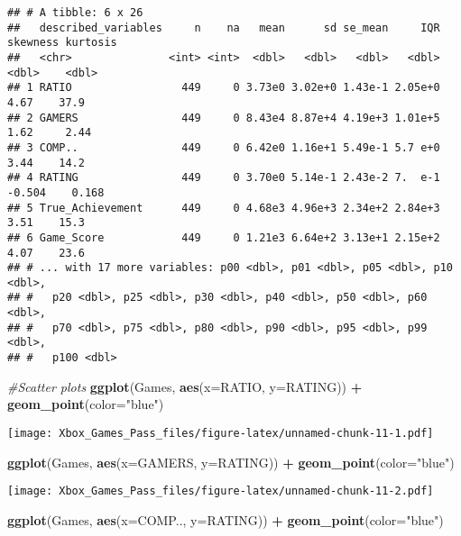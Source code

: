 \documentclass[
]{article}
\newenvironment{Shaded}{\begin{snugshade}}{\end{snugshade}}
\newcommand{\CommentTok}[1]{\textcolor[rgb]{0.56,0.35,0.01}{\textit{#1}}}
\newcommand{\DataTypeTok}[1]{\textcolor[rgb]{0.13,0.29,0.53}{#1}}
\newcommand{\KeywordTok}[1]{\textcolor[rgb]{0.13,0.29,0.53}{\textbf{#1}}}
\newcommand{\NormalTok}[1]{#1}
\newcommand{\OperatorTok}[1]{\textcolor[rgb]{0.81,0.36,0.00}{\textbf{#1}}}
\newcommand{\StringTok}[1]{\textcolor[rgb]{0.31,0.60,0.02}{#1}}
\begin{document}
\begin{verbatim}
## # A tibble: 6 x 26
##   described_variables     n    na   mean      sd se_mean     IQR skewness kurtosis
##   <chr>               <int> <int>  <dbl>   <dbl>   <dbl>   <dbl>    <dbl>    <dbl>
## 1 RATIO                 449     0 3.73e0 3.02e+0 1.43e-1 2.05e+0    4.67    37.9  
## 2 GAMERS                449     0 8.43e4 8.87e+4 4.19e+3 1.01e+5    1.62     2.44 
## 3 COMP..                449     0 6.42e0 1.16e+1 5.49e-1 5.7 e+0    3.44    14.2  
## 4 RATING                449     0 3.70e0 5.14e-1 2.43e-2 7.  e-1   -0.504    0.168
## 5 True_Achievement      449     0 4.68e3 4.96e+3 2.34e+2 2.84e+3    3.51    15.3  
## 6 Game_Score            449     0 1.21e3 6.64e+2 3.13e+1 2.15e+2    4.07    23.6  
## # ... with 17 more variables: p00 <dbl>, p01 <dbl>, p05 <dbl>, p10 <dbl>,
## #   p20 <dbl>, p25 <dbl>, p30 <dbl>, p40 <dbl>, p50 <dbl>, p60 <dbl>,
## #   p70 <dbl>, p75 <dbl>, p80 <dbl>, p90 <dbl>, p95 <dbl>, p99 <dbl>,
## #   p100 <dbl>
\end{verbatim}

\begin{Shaded}
\begin{Highlighting}[]
\CommentTok{#Scatter plots}
\KeywordTok{ggplot}\NormalTok{(Games, }\KeywordTok{aes}\NormalTok{(}\DataTypeTok{x=}\NormalTok{RATIO, }\DataTypeTok{y=}\NormalTok{RATING)) }\OperatorTok{+}\StringTok{ }\KeywordTok{geom_point}\NormalTok{(}\DataTypeTok{color=}\StringTok{"blue"}\NormalTok{)}
\end{Highlighting}
\end{Shaded}

\texttt{[image: Xbox\_Games\_Pass\_files/figure-latex/unnamed-chunk-11-1.pdf]}

\begin{Shaded}
\begin{Highlighting}[]
\KeywordTok{ggplot}\NormalTok{(Games, }\KeywordTok{aes}\NormalTok{(}\DataTypeTok{x=}\NormalTok{GAMERS, }\DataTypeTok{y=}\NormalTok{RATING)) }\OperatorTok{+}\StringTok{ }\KeywordTok{geom_point}\NormalTok{(}\DataTypeTok{color=}\StringTok{"blue"}\NormalTok{)}
\end{Highlighting}
\end{Shaded}

\texttt{[image: Xbox\_Games\_Pass\_files/figure-latex/unnamed-chunk-11-2.pdf]}

\begin{Shaded}
\begin{Highlighting}[]
\KeywordTok{ggplot}\NormalTok{(Games, }\KeywordTok{aes}\NormalTok{(}\DataTypeTok{x=}\NormalTok{COMP.., }\DataTypeTok{y=}\NormalTok{RATING)) }\OperatorTok{+}\StringTok{ }\KeywordTok{geom_point}\NormalTok{(}\DataTypeTok{color=}\StringTok{"blue"}\NormalTok{)}
\end{Highlighting}
\end{Shaded}
\end{document}
